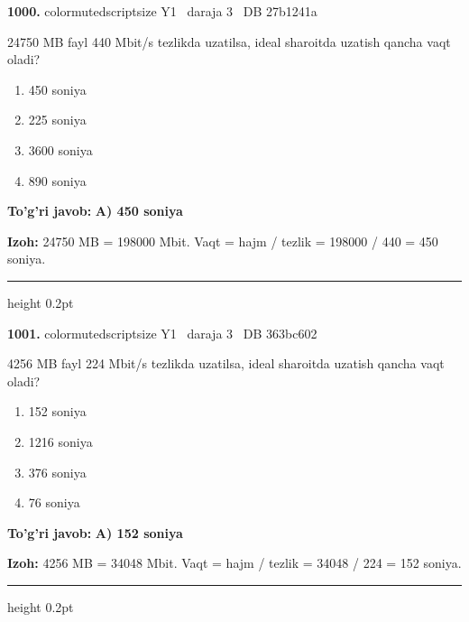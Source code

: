 \documentclass[10pt,a4paper,oneside]{article}
\begin{document}
\noindent\textbf{\color{ink}1000.}  {color{muted}scriptsize Y1 \textbullet\ daraja 3 \textbullet\ DB 27b1241a}
\par
24750 MB fayl 440 Mbit/s tezlikda uzatilsa, ideal sharoitda uzatish qancha vaqt oladi?
\begin{enumerate}[label=\Alph*),leftmargin=9mm]
\item 450 soniya
\item 225 soniya
\item 3600 soniya
\item 890 soniya
\end{enumerate}
\begin{tcolorbox}[enhanced,breakable,colback=teal!4,colframe=teal!50!black,boxrule=0.5pt,arc=1.1mm,left=3mm,right=3mm,top=1.7mm,bottom=1.7mm,before skip=2mm,after skip=2mm]
\textbf{\color{teal}To'g'ri javob:} \textbf{A) 450 soniya}
\par\smallskip
\textbf{Izoh:} 24750 MB = 198000 Mbit. Vaqt = hajm / tezlik = 198000 / 440 = 450 soniya.
\end{tcolorbox}
\vspace{2mm}\hrule height 0.2pt \vspace{3mm}

\noindent\textbf{\color{ink}1001.}  {color{muted}scriptsize Y1 \textbullet\ daraja 3 \textbullet\ DB 363bc602}
\par
4256 MB fayl 224 Mbit/s tezlikda uzatilsa, ideal sharoitda uzatish qancha vaqt oladi?
\begin{enumerate}[label=\Alph*),leftmargin=9mm]
\item 152 soniya
\item 1216 soniya
\item 376 soniya
\item 76 soniya
\end{enumerate}
\begin{tcolorbox}[enhanced,breakable,colback=teal!4,colframe=teal!50!black,boxrule=0.5pt,arc=1.1mm,left=3mm,right=3mm,top=1.7mm,bottom=1.7mm,before skip=2mm,after skip=2mm]
\textbf{\color{teal}To'g'ri javob:} \textbf{A) 152 soniya}
\par\smallskip
\textbf{Izoh:} 4256 MB = 34048 Mbit. Vaqt = hajm / tezlik = 34048 / 224 = 152 soniya.
\end{tcolorbox}
\vspace{2mm}\hrule height 0.2pt \vspace{3mm}
\end{document}
